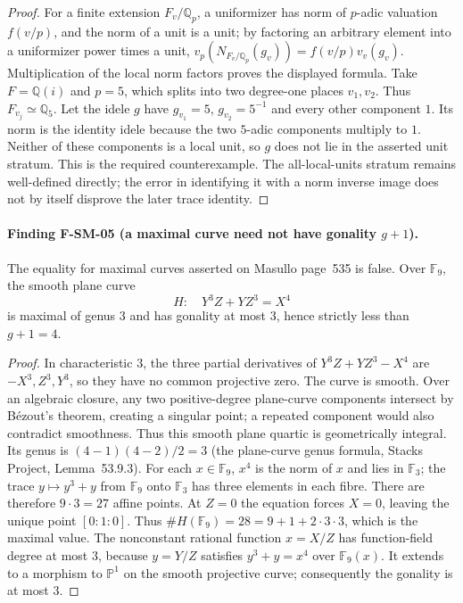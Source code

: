 \begin{proof}
For a finite extension $F_v/\mathbb Q_p$, a uniformizer has norm of
$p$-adic valuation $f(v/p)$, and the norm of a unit is a unit; by factoring
an arbitrary element into a uniformizer power times a unit,
$v_p(N_{F_v/\mathbb Q_p}(g_v))=f(v/p)v_v(g_v)$.  Multiplication of the
local norm factors proves the displayed formula.
Take $F=\mathbb Q(i)$ and $p=5$, which splits into two degree-one places
$v_1,v_2$.  Thus $F_{v_j}\simeq\mathbb Q_5$.  Let the idele $g$ have
$g_{v_1}=5$, $g_{v_2}=5^{-1}$ and every other component $1$.
Its norm is the identity idele because the two $5$-adic components multiply
to $1$.  Neither of these components is a local unit, so $g$ does not lie
in the asserted unit stratum.  This is the required counterexample.
The all-local-units stratum remains well-defined directly; the error in
identifying it with a norm inverse image does not by itself disprove
the later trace identity.
\end{proof}

\paragraph{Finding F-SM-05 (a maximal curve need not have gonality $g+1$).}
The equality for maximal curves asserted on Masullo page~535 is false.
Over $\mathbb F_9$, the smooth plane curve
\[
 H:\quad Y^3Z+YZ^3=X^4
\]
is maximal of genus $3$ and has gonality at most $3$, hence strictly
less than $g+1=4$.

\begin{proof}
In characteristic $3$, the three partial derivatives of
$Y^3Z+YZ^3-X^4$ are $-X^3,Z^3,Y^3$, so they have no common projective
zero.  The curve is smooth.  Over an algebraic closure, any two positive-degree
plane-curve components intersect by B\'ezout's theorem, creating a singular
point; a repeated component would also contradict smoothness.  Thus this
smooth plane quartic is geometrically integral.  Its genus is
$(4-1)(4-2)/2=3$ (the plane-curve genus formula, Stacks Project,
Lemma~53.9.3).  For each $x\in\mathbb F_9$, $x^4$
is the norm of $x$ and lies in $\mathbb F_3$; the trace
$y\mapsto y^3+y$ from $\mathbb F_9$ onto $\mathbb F_3$ has three
elements in each fibre.  There are therefore $9\cdot3=27$ affine
points.  At $Z=0$ the equation forces $X=0$, leaving the unique point
$[0:1:0]$.  Thus $\#H(\mathbb F_9)=28=9+1+2\cdot3\cdot3$,
which is the maximal value.  The nonconstant rational function $x=X/Z$
has function-field degree at most $3$, because $y=Y/Z$ satisfies
$y^3+y=x^4$ over $\mathbb F_9(x)$.  It extends to a morphism to
$\mathbb P^1$ on the smooth projective curve; consequently the gonality
is at most $3$.
\end{proof}

